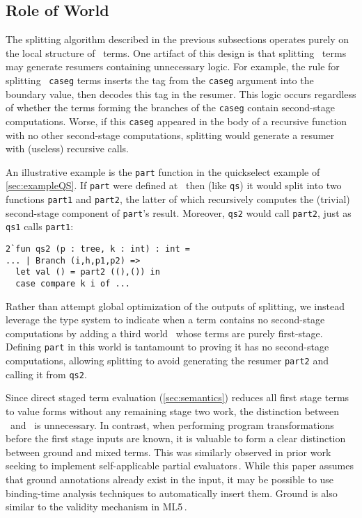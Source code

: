 


\begin{abstrsyn}
\subsection {Role of World \bbonep}
\label{sec:needGround}

The splitting algorithm described in the previous subsections operates
purely on the local structure of \lang\ terms.  One artifact of this design
is that splitting \bbonem\ terms may generate resumers containing
unnecessary logic.  For example, the rule for splitting
\bbonem\ \texttt{caseg} terms inserts the tag from the \texttt{caseg}
argument into the boundary value, then decodes this tag in the
resumer. This logic occurs regardless of whether the terms forming the
branches of the \texttt{caseg} contain second-stage computations.
Worse, if this \texttt{caseg} appeared in the body of a recursive
function with no other second-stage computations, splitting would
generate a resumer with (useless) recursive calls.

An illustrative example is the \texttt{part} function in the quickselect
example of \ref{sec:exampleQS}. If \texttt{part} were defined at \bbonem\
then (like \texttt{qs}) it would split into two functions
\texttt{part1} and \texttt{part2}, the latter of which recursively
computes the (trivial) second-stage component of \texttt{part}'s result.
Moreover, \texttt{qs2} would call \texttt{part2}, just as \texttt{qs1}
calls \texttt{part1}:
\begin{lstlisting}
2`fun qs2 (p : tree, k : int) : int =
... | Branch (i,h,p1,p2) =>
  let val () = part2 ((),()) in
  case compare k i of ...
\end{lstlisting}

Rather than attempt global optimization of the outputs of splitting,
we instead leverage the type system to indicate when a term contains
no second-stage computations by adding a third world \bbonep\ whose
terms are purely first-stage.  
Defining \texttt{part} in this world is 
tantamount to proving it has no second-stage computations,
allowing splitting to avoid generating the resumer \texttt{part2}
and calling it from \texttt{qs2}.

Since direct staged term evaluation (\ref{sec:semantics})
reduces all first stage terms to value forms without any remaining stage two work,
the distinction between \bbonem\ and \bbonep\ is unnecessary.
In contrast, when performing program transformations before the first stage inputs are known,
it is valuable to form a clear distinction between ground and mixed terms.
This was similarly observed in prior work seeking to implement self-applicable partial evaluators\,\cite{Mogensen89a,Mogensen89b}.
While this paper assumes that ground annotations already exist in the input,
it may be possible to use binding-time analysis techniques to automatically insert them.
Ground is also similar to the validity mechanism in ML5\,\cite{murphy05}.


\end{abstrsyn}

